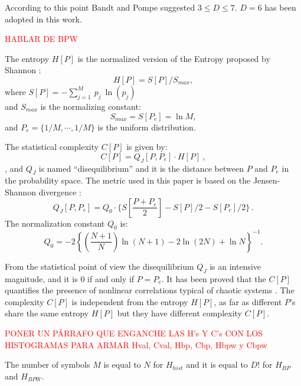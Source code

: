 According to this point Bandt and Pompe suggested $3\leq D \leq 7$. $D=6$ has been adopted in this work.

\textcolor{red}{HABLAR DE BPW}

The entropy $H[P]$ is the normalized version of the Entropy proposed by Shannon \cite{Shannon1948}:
\begin{equation}\label{eq:sha}
H[P] = S[P] /S_{max},
\end{equation}
where $S[P]=-\sum _{j=1}^{M}~p_j~\ln( p_j )$\\ and $S_{max}$ is
the normalizing constant:
\begin{equation}
\label{eq:Smax} S_{max}= S[P_e] = \ln M,
\end{equation}
and $P_e=\{ 1/M, \cdots,1/M\}$ is the uniform distribution.

The statistical complexity $C[P]$ is given by:
\begin{equation}
\label{eq:inten}
C[{P}]=Q_{J}[{P,P_e}]\cdot H[{P}] \ ,
\end{equation}
, and
$Q_{J}$ is named ``disequilibrium'' and it is the distance between $P$ and $P_e$ in the probability space.
The metric used in this paper is based on the Jensen-Shannon divergence \cite{Lamberti2004}:
\begin{equation}
\label{eq:disequi}
Q_{J}[{P,P_e}]= Q_0 \cdot \{S[\frac{P+P_e}{2}]-S[P]/2-S[P_e]/2 \} \ .
\end{equation}
The normalization constant $Q_0$ is:
\begin{equation}
\label{eq:q0j}
Q_0=-2 \left\{ \left( \frac{N+1}{N} \right) \ln(N+1) - 2 \ln(2N) + \ln N \right\}^{-1} .
\end{equation}

From the statistical point of view the disequilibrium $Q_J$ is an intensive magnitude, and it is $0$ if and only if $P=P_e$.
It has been proved that the $C[P]$ quantifies the presence of nonlinear correlations typical of chaotic systems \cite{Martin2003,Lamberti2004}.
The complexity $C[P]$ is independent from the entropy $H[P]$, as far as different $P$'s share the same entropy $H[P]$ but they have different complexity $C[P]$.

\textcolor{red}{PONER UN PÁRRAFO QUE ENGANCHE LAS H's Y C's CON LOS HISTOGRAMAS PARA ARMAR Hval, Cval, Hbp, Cbp, Hbpw y Cbpw}

The number of symbols $M$ is equal to $N$ for $H_{hist}$ and it is equal to $D!$ for $H_{BP}$ and $H_{BPW}$.

